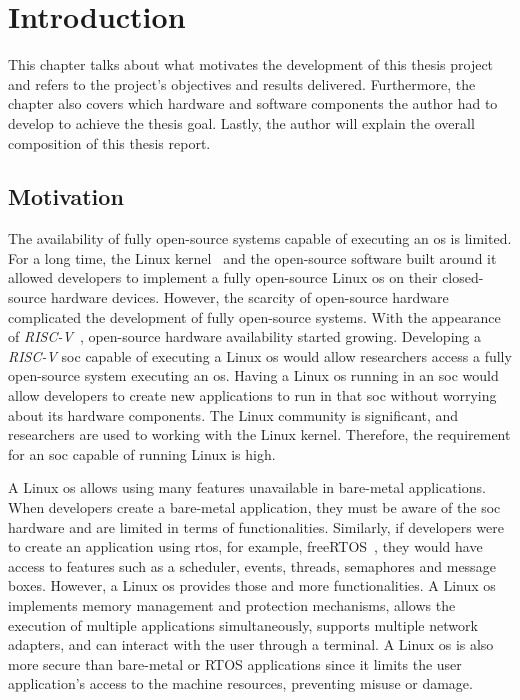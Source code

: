\chapter{Introduction}
\label{chapter:introduction}
This chapter talks about what motivates the development of this thesis project and refers to the project's objectives and results delivered. Furthermore, the chapter also covers which hardware and software components the author had to develop to achieve the thesis goal. Lastly, the author will explain the overall composition of this thesis report.

\section{Motivation}
\label{section:motivation}
The availability of fully open-source systems capable of executing an \acrfull{os} is limited. For a long time, the Linux kernel~\cite{torvalds1997linux} and the open-source software built around it allowed developers to implement a fully open-source Linux \acrshort{os} on their closed-source hardware devices. However, the scarcity of open-source hardware complicated the development of fully open-source systems. With the appearance of \textit{RISC-V}~\cite{asanovic2014instruction}, open-source hardware availability started growing. Developing a \textit{RISC-V} \acrfull{soc} capable of executing a Linux \acrshort{os} would allow researchers access a fully open-source system executing an \acrshort{os}. Having a Linux \acrshort{os} running in an \acrshort{soc} would allow developers to create new applications to run in that \acrshort{soc} without worrying about its hardware components. The Linux community is significant, and researchers are used to working with the Linux kernel. Therefore, the requirement for an \acrshort{soc} capable of running Linux is high.

A Linux \acrshort{os} allows using many features unavailable in bare-metal applications. When developers create a bare-metal application, they must be aware of the \acrshort{soc} hardware and are limited in terms of functionalities. Similarly, if developers were to create an application using \acrfull{rtos}, for example, freeRTOS~\cite{barry2008freertos}, they would have access to features such as a scheduler, events, threads, semaphores and message boxes. However, a Linux \acrshort{os} provides those and more functionalities. A Linux \acrshort{os} implements memory management and protection mechanisms, allows the execution of multiple applications simultaneously, supports multiple network adapters, and can interact with the user through a terminal. A Linux \acrshort{os} is also more secure than bare-metal or RTOS applications since it limits the user application's access to the machine resources, preventing misuse or damage.

